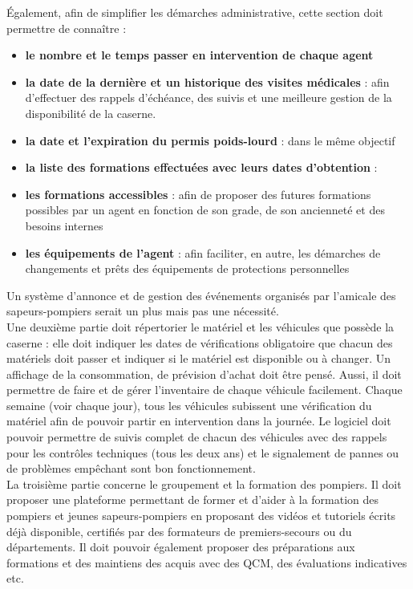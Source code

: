 Également, afin de simplifier les démarches administrative, cette section doit permettre de connaître :
\begin{itemize}
  \item \textbf{le nombre et le temps passer en intervention de chaque agent}
  \item \textbf{la date de la dernière et un historique des visites médicales} : afin d'effectuer des rappels d'échéance, des suivis et une meilleure gestion de la disponibilité de la caserne.
  \item \textbf{la date et l’expiration du permis poids-lourd} : dans le même objectif
  \item \textbf{la liste des formations effectuées avec leurs dates d'obtention} :
  \item \textbf{les formations accessibles} : afin de proposer des futures formations possibles par un agent en fonction de son grade, de son ancienneté et des besoins internes
  \item \textbf{les équipements de l'agent} : afin faciliter, en autre, les démarches de changements et prêts des équipements de protections personnelles
\end{itemize}
Un système d'annonce et de gestion des événements organisés par l'amicale des sapeurs-pompiers serait un plus mais pas une nécessité. \\


Une deuxième partie doit répertorier le matériel et les véhicules que possède la caserne : elle doit indiquer les dates de vérifications obligatoire que chacun des matériels doit passer et indiquer si le matériel est disponible ou à changer. Un affichage de la consommation, de prévision d'achat doit être pensé. Aussi, il doit permettre de faire et de gérer l'inventaire de chaque véhicule facilement. Chaque semaine (voir chaque jour), tous les véhicules subissent une vérification du matériel afin de pouvoir partir en intervention dans la journée. Le logiciel doit pouvoir permettre de suivis complet de chacun des véhicules avec des rappels pour les contrôles techniques (tous les deux ans) et le signalement de pannes ou de problèmes empêchant sont bon fonctionnement.\\ 

La troisième partie concerne le groupement et la formation des pompiers. Il doit proposer une plateforme permettant de former et d'aider à la formation des pompiers et jeunes sapeurs-pompiers en proposant des vidéos et tutoriels écrits déjà disponible, certifiés par des formateurs de premiers-secours ou du départements. Il doit pouvoir également proposer des préparations aux formations et des maintiens des acquis avec des QCM, des évaluations indicatives etc.\\

